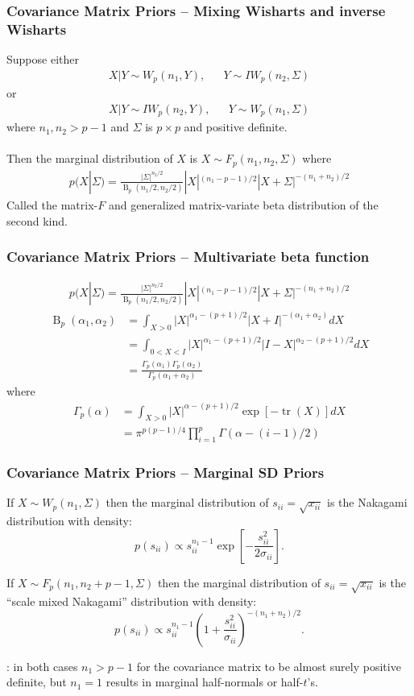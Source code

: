 \documentclass[xcolor=dvipsnames]{beamer}
\DeclareMathOperator{\tr}{tr}
\DeclareMathOperator{\B}{B}
\begin{document}
\begin{frame}
\frametitle{Covariance Matrix Priors -- Mixing Wisharts and inverse Wisharts}
Suppose either 
\begin{align*}
X|Y \sim W_p(n_1,Y), &&Y\sim IW_p(n_2,\Sigma)
\end{align*}
or
\begin{align*}
X|Y \sim IW_p(n_2,Y), &&Y\sim W_p(n_1,\Sigma)
\end{align*}
where $n_1,n_2>p-1$ and $\Sigma$ is $p\times p$ and positive definite.\\~\\
\pause 
Then the marginal distribution of $X$ is $X\sim F_p(n_1,n_2,\Sigma)$ where
\begin{align*}
 p(X|\Sigma) = \frac{\left|\Sigma\right|^{n_2/2}}{\B_p(n_1/2,n_2/2)}|X|^{(n_1 - p - 1)/2}|X + \Sigma|^{-(n_1 + n_2)/2}
\end{align*}
Called the matrix-$F$ and generalized matrix-variate beta distribution of the second kind.
\end{frame}

\begin{frame}
\frametitle{Covariance Matrix Priors -- Multivariate beta function}
\begin{align*}
  p(X|\Sigma) = \frac{\left|\Sigma\right|^{n_2/2}}{\B_p(n_1/2,n_2/2)}|X|^{(n_1 - p - 1)/2}|X + \Sigma|^{-(n_1 + n_2)/2}
\end{align*}
\pause
\begin{align*}
\B_p(\alpha_1, \alpha_2) &= \int_{X>0}|X|^{\alpha_1 - (p + 1)/2}|X + I|^{-(\alpha_1 + \alpha_2)}dX\\
&= \int_{0<X<I}|X|^{\alpha_1 - (p + 1)/2}|I-X|^{\alpha_2 - (p + 1)/2}dX\\
&=\frac{\Gamma_p(\alpha_1)\Gamma_p(\alpha_2)}{\Gamma_p(\alpha_1 + \alpha_2)}
\end{align*}
\pause where
\begin{align*}
\Gamma_p(\alpha) &= \int_{X>0}|X|^{\alpha - (p+1)/2}\exp\left[-\tr(X)\right]dX\\
&=\pi^{p(p-1)/4}\prod_{i=1}^p\Gamma(\alpha - (i-1)/2)
\end{align*}
\end{frame}

\begin{frame}
\frametitle{Covariance Matrix Priors -- Marginal SD Priors}
If $X\sim W_p(n_1,\Sigma)$ then the marginal distribution of $s_{ii}=\sqrt{x_{ii}}$ is the Nakagami distribution with density:
\[
p(s_{ii})\propto s_{ii}^{n_1-1}\exp\left[-\frac{s_{ii}^2}{2\sigma_{ii}}\right].
\]

\pause If $X\sim F_p(n_1, n_2 + p - 1, \Sigma)$ then the marginal distribution of $s_{ii}=\sqrt{x_{ii}}$ is the ``scale mixed Nakagami'' distribution with density:
\[
p(s_{ii})\propto s_{ii}^{n_1 - 1}\left(1 + \frac{s_{ii}^2}{\sigma_{ii}}\right)^{-(n_1 + n_2)/2}.
\]

: in both cases $n_1 > p - 1$ for the covariance matrix to be almost surely positive definite, but $n_1=1$ results in marginal half-normals or half-$t$'s.
\end{frame}
\end{document}
